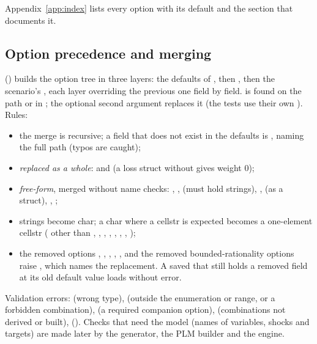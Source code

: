 \documentclass[11pt,a4paper]{article}
\begin{document}
Appendix~\ref{app:index} lists every option with its default and the section that documents it.

\subsection{Option precedence and merging}\label{sec:precedence}

 () builds the option tree in
three layers: the defaults of , then , then
the scenario's , each layer overriding the previous one field by field.
 is found on the path or in ; the optional second argument replaces it (the tests use their own
). Rules:
\begin{itemize}[nosep]
  \item the merge is recursive; a field that does not exist in the defaults is
        , naming the full path (typos are caught);
  \item \emph{replaced as a whole}:  and  (a loss struct
        without  gives  weight 0);
  \item \emph{free-form}, merged without name checks: ,
        ,  (must hold strings),
        ,  (as a struct), ,
        ;
  \item strings become char; a char where a cellstr is expected becomes a one-element cellstr
        ( other than , ,
        , , ,
        , , );
  \item the removed options , , ,
        , ,  and the removed
        bounded-rationality options raise , which names the
        replacement. A saved  that still holds a removed field at
        its old default value loads without error.
\end{itemize}

Validation errors:  (wrong type),  (outside the
enumeration or range, or a forbidden combination),  (a required companion option),
 (combinations not derived or built), 
(). Checks that need the model (names of variables, shocks and
targets) are made later by the generator, the PLM builder and the engine.
\end{document}
